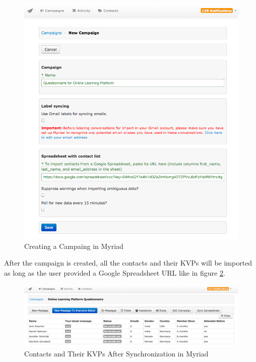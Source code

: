 \begin{figure}[htbp]
	\centering
	\includegraphics[width=1.00\textwidth]{imgs/CreateCampaign.png}
	\caption[Creating a Campaing in Myriad]{Creating a Campaing in Myriad}
	\label{fig:CreateCampaign}
\end{figure}

After the campaign is created, all the contacts and their \ac{KVP}s will be imported as long as the user provided a Google Spreadsheet \ac{URL} like in figure \ref{fig:ContactListInCampaign}.

\begin{figure}[htbp]
	\centering
	\includegraphics[width=1.00\textwidth]{imgs/ContactListInCampaign.png}
	\caption[Contacts and Their \ac{KVP}s After Synchronization in Myriad]{Contacts and Their \ac{KVP}s After Synchronization in Myriad}
	\label{fig:ContactListInCampaign}
\end{figure}

